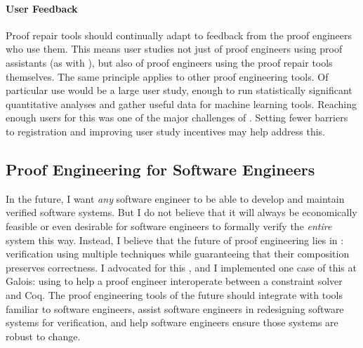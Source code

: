 \paragraph{User Feedback} 
Proof repair tools should continually adapt to feedback from the proof engineers who use them.
This means user studies not just of proof engineers using proof assistants (as with ),
but also of proof engineers using the proof repair tools themselves.
The same principle applies to other proof engineering tools.
Of particular use would be a large user study, enough to run statistically significant quantitative analyses
and gather useful data for machine learning tools.
Reaching enough users for this was one of the major challenges of .
Setting fewer barriers to registration and improving user study incentives may help address this.

\subsection*{Proof Engineering for Software Engineers}

In the future, I want \textit{any} software engineer to be able to develop and maintain verified software systems.
But I do not believe that it will always be economically feasible or even desirable for software engineers to formally verify 
the \textit{entire} system this way.
Instead, I believe that the future of proof engineering lies in :
verification using multiple techniques while guaranteeing that their composition preserves correctness.
I advocated for this , and I implemented one case of this at Galois: using
\sysnamelong to help a proof engineer interoperate between a constraint solver and Coq.
The proof engineering tools of the future should integrate with tools familiar to software engineers,
assist software engineers in redesigning software systems for verification,
and help software engineers ensure those systems are robust to change.

